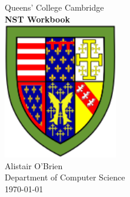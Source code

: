 \documentclass[12pt,oneside]{book}
\begin{document}
    \thispagestyle{empty}
    \begin{center}
        {\LARGE Queens' College Cambridge}\\[1.5cm]
        \linespread{1.2}\huge {\bfseries NST Workbook}\\[1.5cm]
        \linespread{1}
        \includegraphics[width=5cm]{images/Queens.png}\\[1cm]
        {\Large Alistair O'Brien}\\[1cm]
        {\Large Department of Computer Science}\\[1.5cm]
        {\Large \today}
    \end{center}

    \newpage
\end{document}
